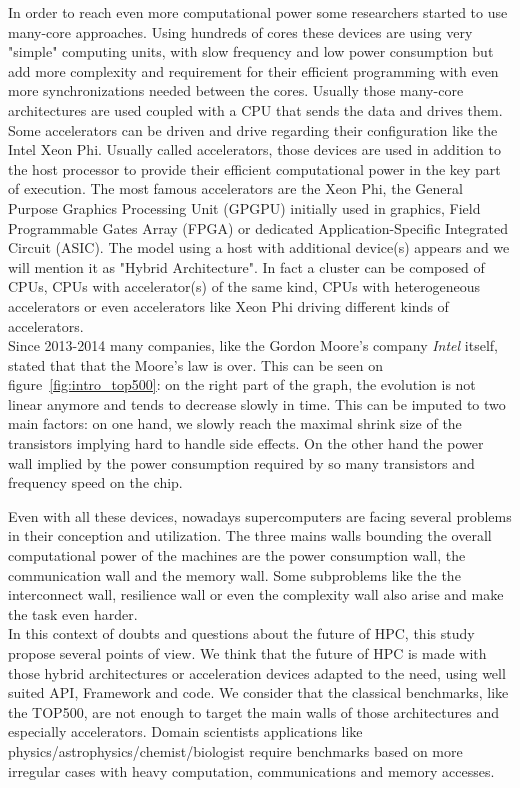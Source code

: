 In order to reach even more computational power some researchers started to use many-core approaches. 
Using hundreds of cores these devices are using very "simple" computing units, with slow frequency and low power consumption but add more complexity and requirement for their efficient programming with even more synchronizations needed between the cores. 
Usually those many-core architectures are used coupled with a CPU that sends the data and drives them.
Some accelerators can be driven and drive regarding their configuration like the Intel Xeon Phi. 
Usually called accelerators, those devices are used in addition to the host processor to provide their efficient computational power in the key part of execution. 
The most famous accelerators are the Xeon Phi, the General Purpose Graphics Processing Unit (GPGPU) initially used in graphics, Field Programmable Gates Array (FPGA) or dedicated Application-Specific Integrated Circuit (ASIC).
The model using a host with additional device(s) appears and we will mention it as "Hybrid Architecture".
In fact a cluster can be composed of CPUs, CPUs with accelerator(s) of the same kind, CPUs with heterogeneous accelerators or even accelerators like Xeon Phi driving different kinds of accelerators.\\

Since 2013-2014 many companies, like the Gordon Moore's company \textit{Intel} itself, stated that that the Moore's law is over. 
This can be seen on figure~\ref{fig:intro_top500}: on the right part of the graph, the evolution is not linear anymore and tends to decrease slowly in time. 
This can be imputed to two main factors: on one hand, we slowly reach the maximal shrink size of the transistors implying hard to handle side effects. 
On the other hand the power wall implied by the power consumption required by so many transistors and frequency speed on the chip.

Even with all these devices, nowadays supercomputers are facing several problems in their conception and utilization. 
The three mains walls bounding the overall computational power of the machines are the power consumption wall, the communication wall and the memory wall.  
Some subproblems like the the interconnect wall, resilience wall or even the complexity wall also arise and make the task even harder.\\

In this context of doubts and questions about the future of HPC, this study propose several points of view. 
We think that the future of HPC is made with those hybrid architectures or acceleration devices adapted to the need, using well suited API, Framework and code.
We consider that the classical benchmarks, like the TOP500, are not enough to target the main walls of those architectures and especially accelerators. 
Domain scientists applications like physics/astrophysics/chemist/biologist require benchmarks based on more irregular cases with heavy computation, communications and memory accesses. 

